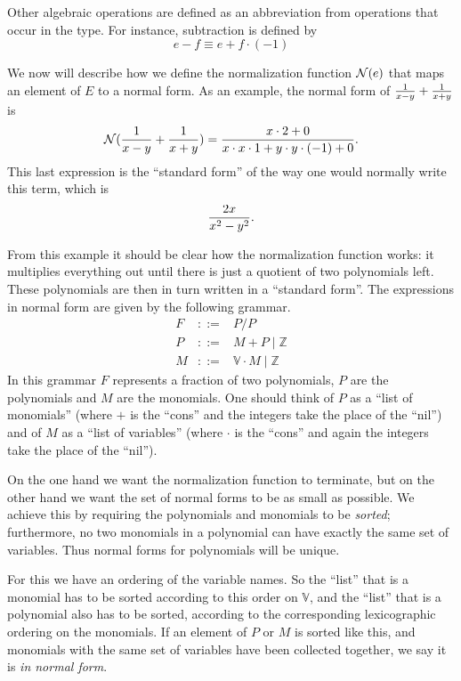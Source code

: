 \documentclass[runningheads]{llncs}
\newcommand{\N}{{\cal N}}
\newcommand{\alt}{\mathrel{|}}
\newcommand{\Z}{{\mathbb Z}}
\newcommand{\V}{{\mathbb V}}
\begin{document}
Other algebraic operations are defined as an abbreviation
from operations that occur in the type.
For instance, subtraction is defined by
$$e - f \equiv e + f\cdot (-1)$$

\noindent
We now will describe how we define the normalization function $\N(e)$
that maps an element of $E$ to a normal form.
As an example, the normal form of ${1\over x - y} + {1\over x + y}$ is
$$\N({1\over x - y} + {1\over x + y}) = {x\cdot 2 + 0\over x\cdot x\cdot 1 + y\cdot y\cdot (-1) + 0}.$$
This last expression is the ``standard form'' of the way one would normally write
this term, which is
$${2x\over x^2 - y^2}.$$

\noindent
From this example it should be clear how the normalization function works:
it multiplies everything out until there is just a quotient of two
polynomials left.
These polynomials are then in turn written in a ``standard form''.
The expressions in normal form are given by the following grammar.
\begin{eqnarray*}
F &::=& P/P \\
P &::=& M + P \alt \Z \\
M &::=& \V \cdot M \alt \Z
\end{eqnarray*}
In this grammar $F$ represents a fraction of two polynomials, $P$ are the
polynomials and $M$ are the monomials.
One should think of $P$ as a ``list of monomials'' (where $+$ is the ``cons''
and the integers take the place of the ``nil'')
and of $M$ as a ``list of variables'' (where $\cdot$ is the ``cons'' and
again the integers take the place of the ``nil'').

On the one hand we want the normalization function to terminate,
but on the other hand we want the set of normal forms to be as small
as possible.
We achieve this by requiring
the polynomials and monomials to be \emph{sorted}; furthermore, no two
monomials in a polynomial can have exactly the same set of variables.
Thus normal forms for polynomials will be unique.

For this we have an ordering of the variable names.
So the ``list'' that is a monomial has to be sorted
according to this order on $\V$, and the ``list'' that
is a polynomial also has to be sorted, according to the
corresponding lexicographic ordering on the monomials.
If an element of $P$ or $M$ is sorted like this,
and monomials with the same set of variables have been collected
together, we say it is \emph{in normal form}.
\end{document}
